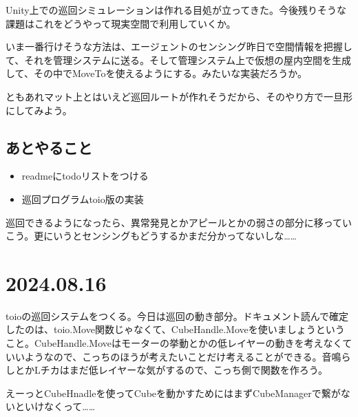 \documentclass[fleqn,twocolumn]{mynote}
\begin{document}
Unity上での巡回シミュレーションは作れる目処が立ってきた。今後残りそうな課題はこれをどうやって現実空間で利用していくか。

いま一番行けそうな方法は、エージェントのセンシング昨日で空間情報を把握して、それを管理システムに送る。そして管理システム上で仮想の屋内空間を生成して、その中でMoveToを使えるようにする。みたいな実装だろうか。

ともあれマット上とはいえど巡回ルートが作れそうだから、そのやり方で一旦形にしてみよう。

\subsection*{あとやること}
\begin{itemize}
  \item readmeにtodoリストをつける
  \item 巡回プログラムtoio版の実装
\end{itemize}

巡回できるようになったら、異常発見とかアピールとかの弱さの部分に移っていこう。更にいうとセンシングもどうするかまだ分かってないしな……

\section*{2024.08.16}
toioの巡回システムをつくる。今日は巡回の動き部分。ドキュメント読んで確定したのは、toio.Move関数じゃなくて、CubeHandle.Moveを使いましょうということ。CubeHandle.Moveはモーターの挙動とかの低レイヤーの動きを考えなくていいようなので、こっちのほうが考えたいことだけ考えることができる。音鳴らしとかLチカはまだ低レイヤーな気がするので、こっち側で関数を作ろう。

えーっとCubeHnadleを使ってCubeを動かすためにはまずCubeManagerで繋がないといけなくって……
\end{document}
